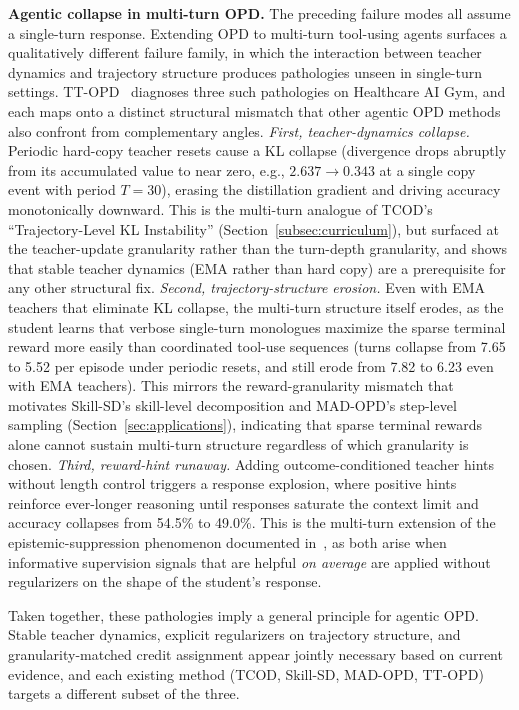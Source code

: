 \documentclass{article} %
\begin{document}
\textbf{Agentic collapse in multi-turn OPD.} The preceding failure modes all assume a single-turn response. Extending OPD to multi-turn tool-using agents surfaces a qualitatively different failure family, in which the interaction between teacher dynamics and trajectory structure produces pathologies unseen in single-turn settings. TT-OPD~\citep{ttopd2026} diagnoses three such pathologies on Healthcare AI Gym, and each maps onto a distinct structural mismatch that other agentic OPD methods also confront from complementary angles. \emph{First, teacher-dynamics collapse.} Periodic hard-copy teacher resets cause a KL collapse (divergence drops abruptly from its accumulated value to near zero, e.g., $2.637 \to 0.343$ at a single copy event with period $T{=}30$), erasing the distillation gradient and driving accuracy monotonically downward. This is the multi-turn analogue of TCOD's ``Trajectory-Level KL Instability'' (Section~\ref{subsec:curriculum}), but surfaced at the teacher-update granularity rather than the turn-depth granularity, and shows that stable teacher dynamics (EMA rather than hard copy) are a prerequisite for any other structural fix. \emph{Second, trajectory-structure erosion.} Even with EMA teachers that eliminate KL collapse, the multi-turn structure itself erodes, as the student learns that verbose single-turn monologues maximize the sparse terminal reward more easily than coordinated tool-use sequences (turns collapse from 7.65 to 5.52 per episode under periodic resets, and still erode from 7.82 to 6.23 even with EMA teachers). This mirrors the reward-granularity mismatch that motivates Skill-SD's skill-level decomposition and MAD-OPD's step-level sampling (Section~\ref{sec:applications}), indicating that sparse terminal rewards alone cannot sustain multi-turn structure regardless of which granularity is chosen. \emph{Third, reward-hint runaway.} Adding outcome-conditioned teacher hints without length control triggers a response explosion, where positive hints reinforce ever-longer reasoning until responses saturate the context limit and accuracy collapses from 54.5\% to 49.0\%. This is the multi-turn extension of the epistemic-suppression phenomenon documented in~\citet{2603.24472}, as both arise when informative supervision signals that are helpful \emph{on average} are applied without regularizers on the shape of the student's response.

Taken together, these pathologies imply a general principle for agentic OPD. Stable teacher dynamics, explicit regularizers on trajectory structure, and granularity-matched credit assignment appear jointly necessary based on current evidence, and each existing method (TCOD, Skill-SD, MAD-OPD, TT-OPD) targets a different subset of the three.
\end{document}
